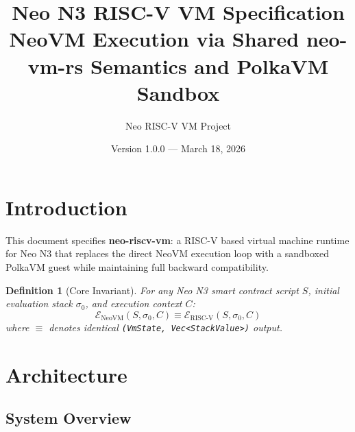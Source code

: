 \documentclass[11pt,a4paper]{article}
\title{Neo N3 RISC-V VM Specification\\[0.5em]
\large NeoVM Execution via Shared neo-vm-rs Semantics and PolkaVM Sandbox}
\author{Neo RISC-V VM Project}
\date{Version 1.0.0 --- March 18, 2026}
\newtheorem{definition}{Definition}[section]
\begin{document}
\maketitle
\tableofcontents
\newpage

\section{Introduction}

This document specifies \textbf{neo-riscv-vm}: a RISC-V based virtual machine runtime for Neo N3 that replaces the direct NeoVM execution loop with a sandboxed PolkaVM guest while maintaining full backward compatibility.

\begin{definition}[Core Invariant]
For any Neo N3 smart contract script $S$, initial evaluation stack $\sigma_0$, and execution context $C$:
\[
\mathcal{E}_{\text{NeoVM}}(S, \sigma_0, C) \equiv \mathcal{E}_{\text{RISC-V}}(S, \sigma_0, C)
\]
where $\equiv$ denotes identical \texttt{(VmState, Vec<StackValue>)} output.
\end{definition}

\section{Architecture}

\subsection{System Overview}
\end{document}
